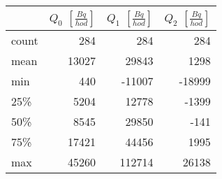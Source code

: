 \begin{tabular}{lrrr}
\toprule
{} &  $Q_0$ $\left[\si{\frac{Bq}{hod}}\right]$ &  $Q_1$ $\left[\si{\frac{Bq}{hod}}\right]$ &  $Q_2$ $\left[\si{\frac{Bq}{hod}}\right]$ \\
\midrule
count &                                       284 &                                       284 &                                       284 \\
mean  &                                     13027 &                                     29843 &                                      1298 \\
min   &                                       440 &                                    -11007 &                                    -18999 \\
25\%   &                                      5204 &                                     12778 &                                     -1399 \\
50\%   &                                      8545 &                                     29850 &                                      -141 \\
75\%   &                                     17421 &                                     44456 &                                      1995 \\
max   &                                     45260 &                                    112714 &                                     26138 \\
\bottomrule
\end{tabular}
